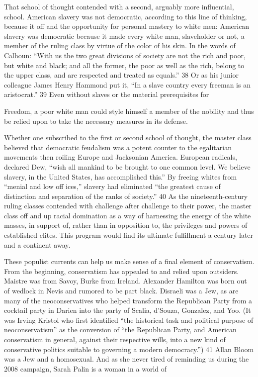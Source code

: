  \par 
That school of thought contended with a second, arguably more influential, school. American slavery was not democratic, according to this line of thinking, because it off and the opportunity for personal mastery to white men: American slavery was democratic because it made every white man, slaveholder or not, a member of the ruling class by virtue of the color of his skin. In the words of Calhoun: “With us the two great divisions of society are not the rich and poor, but white and black; and all the former, the poor as well as the rich, belong to the upper class, and are respected and treated as equals.” {\color{blue}38} Or as his junior colleague James Henry Hammond put it, “In a slave country every freeman is an aristocrat.” {\color{blue}39} Even without slaves or the material prerequisites for
 \par 
Freedom, a poor white man could style himself a member of the nobility and thus be relied upon to take the necessary measures in its defense.
 \par 
Whether one subscribed to the first or second school of thought, the master class believed that democratic feudalism was a potent counter to the egalitarian movements then roiling Europe and Jacksonian America. European radicals, declared Dew, “wish all mankind to be brought to one common level. We believe slavery, in the United States, has accomplished this.” By freeing whites from “menial and low off ices,” slavery had eliminated “the greatest cause of distinction and separation of the ranks of society.” {\color{blue}40} As the nineteenth-century ruling classes contended with challenge after challenge to their power, the master class off and up racial domination as a way of harnessing the energy of the white masses, in support of, rather than in opposition to, the privileges and powers of established elites. This program would find its ultimate fulfillment a century later and a continent away.
 \par 
These populist currents can help us make sense of a final element of conservatism. From the beginning, conservatism has appealed to and relied upon outsiders. Maistre was from Savoy, Burke from Ireland. Alexander Hamilton was born out of wedlock in Nevis and rumored to be part black. Disraeli was a Jew, as are many of the neoconservatives who helped transform the Republican Party from a cocktail party in Darien into the party of Scalia, d’Souza, Gonzalez, and Yoo. (It was Irving Kristol who first identified “the historical task and political purpose of neoconservatism” as the conversion of “the Republican Party, and American conservatism in general, against their respective wills, into a new kind of conservative politics suitable to governing a modern democracy.”) {\color{blue}41} Allan Bloom was a Jew and a homosexual. And as she never tired of reminding us during the 2008 campaign, Sarah Palin is a woman in a world of
